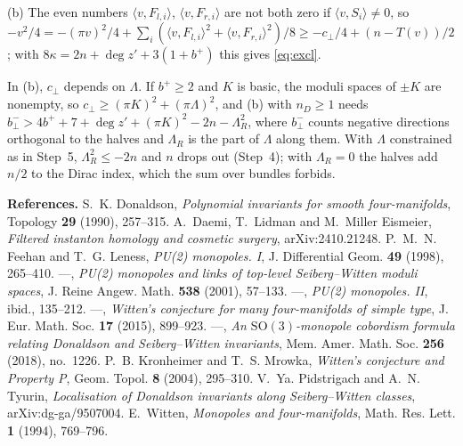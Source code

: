 \documentclass[10pt]{amsart}
\makeatletter
\numberwithin{equation}{section}
\theoremstyle{compact}
\renewenvironment{proof}[1][\proofname]{\par\pushQED{\qed}\normalfont
  \topsep4\p@\relax\trivlist\item[\hskip\labelsep\itshape#1\@addpunct{.}]%
  \ignorespaces}{\popQED\endtrivlist\@endpefalse}
\renewenvironment{thebibliography}[1]{\par\footnotesize\noindent
  \textbf{References.}\ignorespaces
  \def\@lbibitem[##1]##2{\unskip\enspace[##1]~\if@filesw\immediate
    \write\@auxout{\string\bibcite{##2}{##1}}\fi\ignorespaces}%
  \def\bysame{---}}{\par}
\makeatother
\begin{document}
\begin{proof}
(b) The even numbers $\langle v,F_{l,i}\rangle$, $\langle
v,F_{r,i}\rangle$ are not both zero if $\langle v,S_i\rangle\neq0$, so
$-v^2/4=-(\pi v)^2/4+\sum_i(\langle v,F_{l,i}\rangle^2+\langle
v,F_{r,i}\rangle^2)/8\ge-c_\perp/4+(n-T(v))/2$; with
$8\kappa=2n+\deg z'+3(1+b^+)$ this gives \eqref{eq:excl}.
\end{proof}

In (b), $c_\perp$ depends on $\Lambda$. If $b^+\ge2$ and $K$ is basic, the
moduli spaces of $\pm K$ are nonempty, so $c_\perp\ge(\pi K)^2+(\pi\Lambda)^2$,
and (b) with $n_D\ge1$ needs
$b^-_\perp>4b^++7+\deg z'+(\pi K)^2-2n-\Lambda_R^2$, where $b^-_\perp$ counts
negative directions orthogonal to the halves and $\Lambda_R$ is the part of
$\Lambda$ along them. With $\Lambda$ constrained as in Step~5,
$\Lambda_R^2\le-2n$ and $n$ drops out (Step~4); with $\Lambda_R=0$ the halves
add $n/2$ to the Dirac index, which the sum over bundles forbids.

\begin{thebibliography}{DLME}
 S.~K. Donaldson, \emph{Polynomial invariants for smooth
four-manifolds}, Topology \textbf{29} (1990), 257--315.
 A.~Daemi, T.~Lidman and M.~Miller Eismeier,
\emph{Filtered instanton homology and cosmetic surgery}, arXiv:2410.21248.
 P.~M.~N. Feehan and T.~G. Leness, \emph{PU(2) monopoles.
I}, J. Differential Geom. \textbf{49} (1998), 265--410.
 \bysame, \emph{PU(2) monopoles and links of top-level
Seiberg--Witten moduli spaces}, J. Reine Angew. Math. \textbf{538} (2001),
57--133.
 \bysame, \emph{PU(2) monopoles. II}, ibid., 135--212.
 \bysame, \emph{Witten's conjecture for many four-manifolds
of simple type}, J. Eur. Math. Soc. \textbf{17} (2015), 899--923.
 \bysame, \emph{An $\mathrm{SO}(3)$-monopole cobordism
formula relating Donaldson and Seiberg--Witten invariants}, Mem. Amer. Math.
Soc. \textbf{256} (2018), no.~1226.
 P.~B. Kronheimer and T.~S. Mrowka, \emph{Witten's
conjecture and Property P}, Geom. Topol. \textbf{8} (2004), 295--310.
 V.~Ya. Pidstrigach and A.~N. Tyurin, \emph{Localisation of
Donaldson invariants along Seiberg--Witten classes}, arXiv:dg-ga/9507004.
 E.~Witten, \emph{Monopoles and four-manifolds}, Math. Res.
Lett. \textbf{1} (1994), 769--796.
\end{thebibliography}
\end{document}
